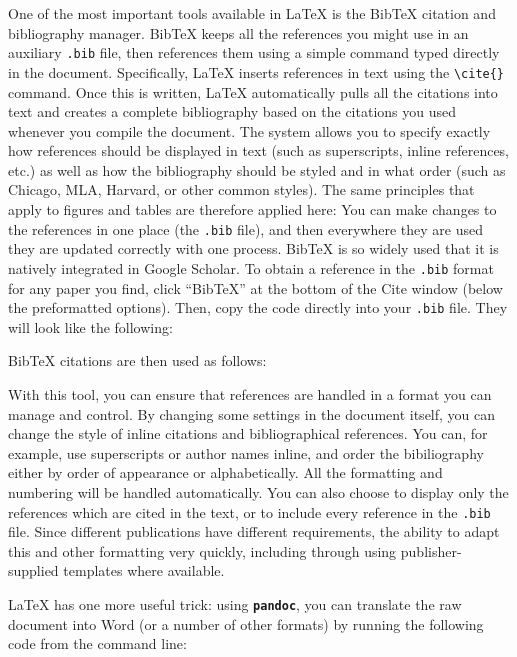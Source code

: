 One of the most important tools available in {\LaTeX}
is the BibTeX citation and bibliography manager.\cite{kopka1995guide}
BibTeX keeps all the references you might use in an auxiliary \texttt{.bib} file,
then references them using a simple command typed directly in the document.
Specifically, {\LaTeX} inserts references in text using the \texttt{\textbackslash cite\{\}} command.
Once this is written, {\LaTeX} automatically pulls all the citations into text
and creates a complete bibliography based on the citations you used whenever you compile the document.
The system allows you to specify exactly how references should be displayed in text
(such as superscripts, inline references, etc.)
as well as how the bibliography should be styled and in what order
(such as Chicago, MLA, Harvard, or other common styles).
The same principles that apply to figures and tables are therefore applied here:
You can make changes to the references in one place (the \texttt{.bib} file),
and then everywhere they are used they are updated correctly with one process.
BibTeX is so widely used that it is natively integrated in Google Scholar.
To obtain a reference in the \texttt{.bib} format for any paper you find,
click ``BibTeX'' at the bottom of the Cite window (below the preformatted options).
Then, copy the code directly into your \texttt{.bib} file.
They will look like the following:


\noindent BibTeX citations are then used as follows:


With this tool, you can ensure that references are handled
in a format you can manage and control.\cite{flom2005latex}
By changing some settings in the document itself,
you can change the style of inline citations and bibliographical references.
You can, for example, use superscripts or author names inline,
and order the bibiliography either by order of appearance or alphabetically.
All the formatting and numbering will be handled automatically.
You can also choose to display only the references which are cited in the text,
or to include every reference in the \texttt{.bib} file.
Since different publications have different requirements,
the ability to adapt this and other formatting very quickly,
including through using publisher-supplied templates where available.

{\LaTeX} has one more useful trick:
using \textbf{\texttt{pandoc}},
you can translate the raw document into Word
(or a number of other formats)
by running the following code from the command line:

